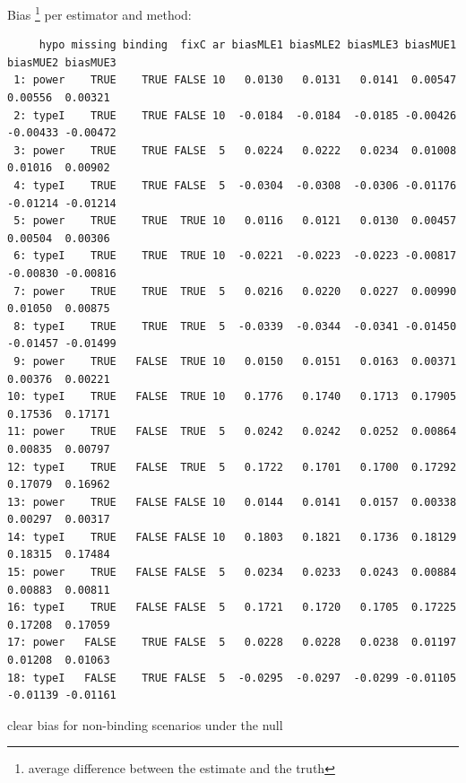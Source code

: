 \documentclass[12pt]{article}
\newcommand\Warning[1][3ex]{%
\renewcommand\stacktype{L}%
\scaleto{\stackon[1.3pt]{\color{red}$\triangle$}{\tiny\bfseries !}}{#1}%
\xspace
}
\begin{document}
Bias \footnote{average difference between the estimate and the truth} per estimator and method:
\begin{adjustwidth}{-1cm}{-1cm}
\begin{verbatim}
     hypo missing binding  fixC ar biasMLE1 biasMLE2 biasMLE3 biasMUE1 biasMUE2 biasMUE3
 1: power    TRUE    TRUE FALSE 10   0.0130   0.0131   0.0141  0.00547  0.00556  0.00321
 2: typeI    TRUE    TRUE FALSE 10  -0.0184  -0.0184  -0.0185 -0.00426 -0.00433 -0.00472
 3: power    TRUE    TRUE FALSE  5   0.0224   0.0222   0.0234  0.01008  0.01016  0.00902
 4: typeI    TRUE    TRUE FALSE  5  -0.0304  -0.0308  -0.0306 -0.01176 -0.01214 -0.01214
 5: power    TRUE    TRUE  TRUE 10   0.0116   0.0121   0.0130  0.00457  0.00504  0.00306
 6: typeI    TRUE    TRUE  TRUE 10  -0.0221  -0.0223  -0.0223 -0.00817 -0.00830 -0.00816
 7: power    TRUE    TRUE  TRUE  5   0.0216   0.0220   0.0227  0.00990  0.01050  0.00875
 8: typeI    TRUE    TRUE  TRUE  5  -0.0339  -0.0344  -0.0341 -0.01450 -0.01457 -0.01499
 9: power    TRUE   FALSE  TRUE 10   0.0150   0.0151   0.0163  0.00371  0.00376  0.00221
10: typeI    TRUE   FALSE  TRUE 10   0.1776   0.1740   0.1713  0.17905  0.17536  0.17171
11: power    TRUE   FALSE  TRUE  5   0.0242   0.0242   0.0252  0.00864  0.00835  0.00797
12: typeI    TRUE   FALSE  TRUE  5   0.1722   0.1701   0.1700  0.17292  0.17079  0.16962
13: power    TRUE   FALSE FALSE 10   0.0144   0.0141   0.0157  0.00338  0.00297  0.00317
14: typeI    TRUE   FALSE FALSE 10   0.1803   0.1821   0.1736  0.18129  0.18315  0.17484
15: power    TRUE   FALSE FALSE  5   0.0234   0.0233   0.0243  0.00884  0.00883  0.00811
16: typeI    TRUE   FALSE FALSE  5   0.1721   0.1720   0.1705  0.17225  0.17208  0.17059
17: power   FALSE    TRUE FALSE  5   0.0228   0.0228   0.0238  0.01197  0.01208  0.01063
18: typeI   FALSE    TRUE FALSE  5  -0.0295  -0.0297  -0.0299 -0.01105 -0.01139 -0.01161
\end{verbatim}
\end{adjustwidth}
\Warning clear bias for non-binding scenarios under the null
\end{document}

